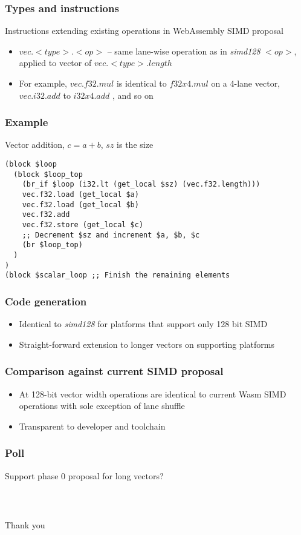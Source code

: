\documentclass[t,aspectratio=169, xcolor={table}]{beamer}
\begin{document}
\begin{frame}
\frametitle{Types and instructions}
Instructions extending existing operations in WebAssembly SIMD proposal
  \begin{itemize}
  \item $vec.<type>.<op>$ -- same lane-wise operation as in \textit{simd128} $<op>$, applied to vector of $vec.<type>.length$
  \item[] For example, $vec.f32.mul$ is identical to $f32x4.mul$ on a 4-lane vector, $vec.i32.add$ to $i32x4.add$ , and so on
  \end{itemize}
\end{frame}
\begin{frame}[containsverbatim]
\frametitle{Example}
Vector addition, $c = a + b$, $sz$ is the size
\begin{lstlisting}
(block $loop
  (block $loop_top
    (br_if $loop (i32.lt (get_local $sz) (vec.f32.length)))
    vec.f32.load (get_local $a)
    vec.f32.load (get_local $b)
    vec.f32.add
    vec.f32.store (get_local $c)
    ;; Decrement $sz and increment $a, $b, $c
    (br $loop_top)
  )
)
(block $scalar_loop ;; Finish the remaining elements
\end{lstlisting}
\end{frame}
\begin{frame}
\frametitle{Code generation}
  \begin{itemize}
  \item Identical to \textit{simd128} for platforms that support only 128 bit SIMD
  \item Straight-forward extension to longer vectors on supporting platforms
  \end{itemize}
\end{frame}
\begin{frame}
\frametitle{Comparison against current SIMD proposal}
  \begin{itemize}
  \item At 128-bit vector width operations are identical to current Wasm SIMD operations with sole exception of lane shuffle
  \item Transparent to developer and toolchain
  \end{itemize}
\end{frame}
\begin{frame}
\frametitle{Poll}
Support phase 0 proposal for long vectors?
\end{frame}
\begin{frame}
\frametitle{~}
\huge{Thank you}
\end{frame}
\end{document}
